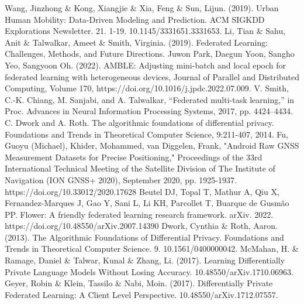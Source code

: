 \documentclass[conference]{IEEEtran}
\begin{document}
\begin{thebibliography}{00}
 Wang, Jinzhong \& Kong, Xiangjie \& Xia, Feng \& Sun, Lijun. (2019). Urban Human Mobility: Data-Driven Modeling and Prediction. ACM SIGKDD Explorations Newsletter. 21. 1-19. 10.1145/3331651.3331653. 
 Li, Tian \& Sahu, Anit \& Talwalkar, Ameet \& Smith, Virginia. (2019). Federated Learning: Challenges, Methods, and Future Directions. 
 Juwon Park, Daegun Yoon, Sangho Yeo, Sangyoon Oh. (2022). AMBLE: Adjusting mini-batch and local epoch for federated learning with heterogeneous devices, Journal of Parallel and Distributed Computing, Volume 170, https://doi.org/10.1016/j.jpdc.2022.07.009.
 V. Smith, C.-K. Chiang, M. Sanjabi, and A. Talwalkar, “Federated multi-task learning,” in Proc. Advances in Neural Information Processing Systems, 2017, pp. 4424–4434.
 C. Dwork and A. Roth. The algorithmic foundations of differential privacy. Foundations and Trends in Theoretical Computer Science, 9:211-407, 2014.
 Fu, Guoyu (Michael), Khider, Mohammed, van Diggelen, Frank, "Android Raw GNSS Measurement Datasets for Precise Positioning," Proceedings of the 33rd International Technical Meeting of the Satellite Division of The Institute of Navigation (ION GNSS+ 2020), September 2020, pp. 1925-1937. https://doi.org/10.33012/2020.17628
 Beutel DJ, Topal T, Mathur A, Qiu X, Fernandez-Marques J, Gao Y, Sani L, Li KH, Parcollet T, Buarque de Gusmão PP. Flower: A friendly federated learning research framework.
arXiv. 2022. https://doi.org/10.48550/arXiv.2007.14390
 Dwork, Cynthia \& Roth, Aaron. (2013). The Algorithmic Foundations of Differential Privacy. Foundations and Trends in Theoretical Computer Science. 9. 10.1561/0400000042. 
 McMahan, H. \& Ramage, Daniel \& Talwar, Kunal \& Zhang, Li. (2017). Learning Differentially Private Language Models Without Losing Accuracy. 10.48550/arXiv.1710.06963.
 Geyer, Robin \& Klein, Tassilo \& Nabi, Moin. (2017). Differentially Private Federated Learning: A Client Level Perspective. 10.48550/arXiv.1712.07557.

\end{thebibliography}
\vspace{12pt}
\end{document}
